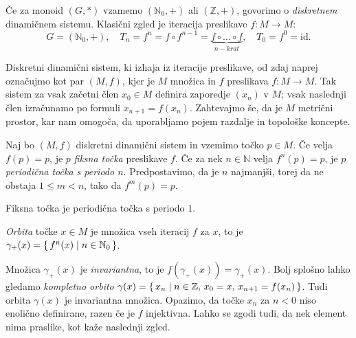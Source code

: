 \documentclass{isrmdelo}
\newcommand{\N}{\mathbb N}
\newcommand{\Z}{\mathbb Z}
\newcommand{\id}{\mathrm{id}}
\begin{document}
Če za monoid $(G, *)$ vzamemo $(\N_0, +)$ ali $(\Z, +)$, govorimo o \emph{diskretnem} dinamičnem sistemu. Klasični zgled je iteracija preslikave $f: M \rightarrow M$: $$G = (\N_0, +), \quad T_n = f^n = f \circ f^{n-1} = \underbrace{f \circ \dots \circ f}_{n-krat}, \quad T_0 = f^0 = \id.$$

Diskretni dinamični sistem, ki izhaja iz iteracije preslikave, od zdaj naprej označujmo kot par $(M, f)$, kjer je $M$ množica in $f$ preslikava $f: M \rightarrow M$. Tak sistem za vsak začetni člen $x_0 \in M$ definira zaporedje $(x_n)$ v $M$; vsak naslednji člen izračunamo po formuli $x_{n+1} = f(x_n)$. Zahtevajmo še, da je $M$ metrični prostor, kar nam omogoča, da uporabljamo pojem razdalje in topološke koncepte.

\bigskip

\begin{definicija}
Naj bo $(M,f)$ diskretni dinamični sistem in vzemimo točko $p \in M$. Če velja $f(p) = p$, je $p$ \emph{fiksna točka} preslikave $f$. Če za nek $n \in \N$ velja $f^n (p) = p$, je $p$ \emph{periodična točka s periodo $n$}. Predpostavimo, da je $n$ najmanjši, torej da ne obstaja $1 \leq m < n$, tako da $f^m(p) = p$.
\end{definicija}

Fiksna točka je periodična točka s periodo $1$.

\begin{definicija}
\emph{Orbita} točke $x \in M$ je množica vseh iteracij $f$ za $x$, to je $\gamma_{+}(x) = \set{ f^{n}(x) \mid n \in \N_0 }$.
\end{definicija}

Množica $\gamma_{+}(x)$ je \emph{invariantna}, to je $f(\gamma_{+}(x)) = \gamma_{+}(x)$. Bolj splošno lahko gledamo \emph{kompletno orbito} $\gamma(x) = \set{ x_n \mid n \in \Z, \, x_0 = x, \, x_{n+1} = f(x_n) }$. Tudi orbita $\gamma(x)$ je invariantna množica. Opazimo, da točke $x_n$ za $n < 0$ niso enolično definirane, razen če je $f$ injektivna. Lahko se zgodi tudi, da nek element nima praslike, kot kaže naslednji zgled.
\end{document}
